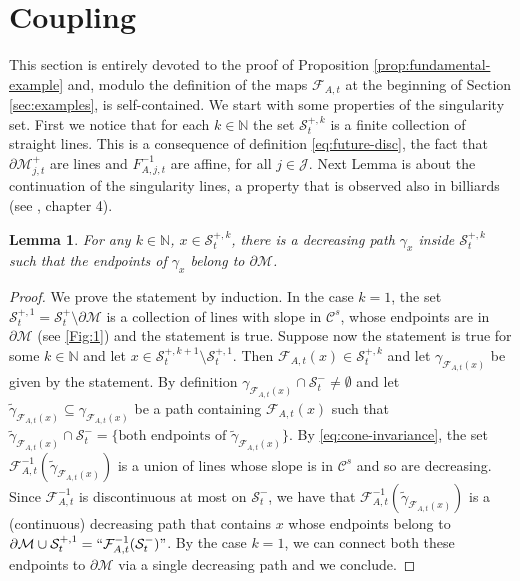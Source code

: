 \documentclass{amsart}
\numberwithin{equation}{section}
\newtheorem{lemma}[theorem]{Lemma}
\newcommand\cF{{\mathcal F}}
\newcommand\cJ{{\mathcal J}}
\newcommand\cM{{\mathcal M}}
\newcommand\cS{{\mathcal S}}
\newcommand\bN{{\mathbb N}}
\newcommand{\catt}{\cF_{A,t}}
\newcommand{\catjt}{F_{A,j,t}}
\begin{document}
\section{Coupling} \label{sec:coupling}
This section is entirely devoted to the proof of Proposition \ref{prop:fundamental-example} and, modulo the definition of the maps \(\catt\) at the beginning of Section \ref{sec:examples}, is self-contained. We start with some properties of the singularity set.
First we notice that for each \(k \in \bN\) the set \(\cS_t^{+,k}\) is a finite collection of straight lines. This is a consequence of definition \eqref{eq:future-disc}, the fact that \(\partial \cM^+_{j,t}\) are lines and \(\catjt^{-1}\) are affine, for all \(j \in \cJ\). Next Lemma is about the continuation of the singularity lines, a property that is observed also in billiards (see \cite{CM06}, chapter 4).
\begin{lemma}\label{lem:geom-disc}
 For any \(k \in \bN\), \(x \in \cS_t^{+,k}\), there is a decreasing path \(\gamma_x\) inside \(\cS_t^{+,k}\) such that the endpoints of \(\gamma_x\) belong to \(\partial \cM\).
\end{lemma}
\begin{proof}
We prove the statement by induction. In the case \(k=1\), the set \(\cS_t^{+,1} = \cS_{t}^+ \setminus \partial \cM\) is a collection of lines with slope in \(\mathscr C^s\), whose endpoints are in \(\partial \cM\) (see \ref{Fig:1}) and the statement is true. Suppose now the statement is true for some \(k \in \bN\) and let \(x \in \cS_t^{+,k+1}\setminus \cS_t^{+,1}\). Then \(\catt(x) \in \cS_t^{+,k}\) and let \(\gamma_{\catt(x)}\) be given by the statement. By definition \(\gamma_{\catt(x)} \cap \cS_t^{-} \neq \emptyset\) and let \(\widetilde \gamma_{\catt(x)} \subseteq \gamma_{\catt(x)}\) be a path containing \(\catt(x)\) such that \(\widetilde \gamma_{\catt(x)} \cap \cS_t^{-} = \{\text{both endpoints of }\widetilde \gamma_{\catt(x)}\}\). By \eqref{eq:cone-invariance}, the set \(\catt^{-1}(\widetilde \gamma_{\catt(x)})\) is a union of lines whose slope is in \(\mathscr C^s\) and so are decreasing. Since \(\catt^{-1}\) is discontinuous at most on \(\cS_t^{-}\), we have that \(\catt^{-1}(\widetilde \gamma_{\catt(x)})\) is a (continuous) decreasing path that contains \(x\) whose endpoints belong to \(\partial \cM \cup \cS_t^{+,1} = \text{“} \catt^{-1}(\cS_t^{-})"\). By the case \(k = 1\), we can connect both these endpoints to \(\partial \cM\) via a single decreasing path and we conclude.
\end{proof}
\end{document}
